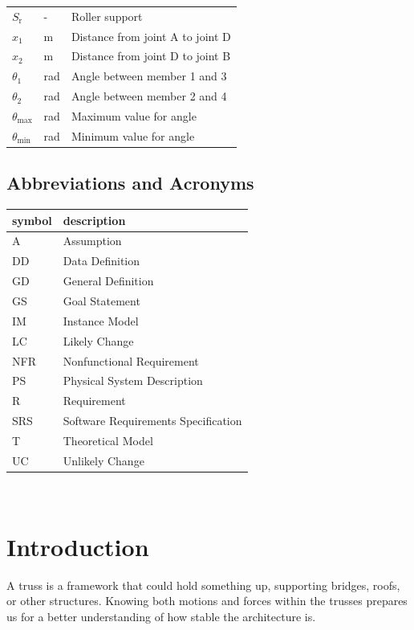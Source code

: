\documentclass[12pt]{article}
\begin{document}
\begin{longtable*}{l l p{12cm}}
$S_\text{r}$ & - & Roller support \\
$x_\text{1}$ & \si{\meter} & Distance from joint A to joint D \\
$x_\text{2}$ & \si{\meter} & Distance from joint D to joint B \\
$\theta_\text{1}$ & \si{\radian} & Angle between member 1 and 3 \\
$\theta_\text{2}$ & \si{\radian} & Angle between member 2 and 4 \\
$\theta_{\text{max}}$ & \si{\radian} & Maximum value for angle \\
$\theta_{\text{min}}$ & \si{\radian} & Minimum value for angle \\
\bottomrule
\end{longtable*}

\subsection{Abbreviations and Acronyms}

\renewcommand{\arraystretch}{1.2}
\begin{tabular}{l l} 
  \toprule		
  \textbf{symbol} & \textbf{description}\\
  \midrule 
  A & Assumption\\
  DD & Data Definition\\
  GD & General Definition\\
  GS & Goal Statement\\
  IM & Instance Model\\
  LC & Likely Change\\
  NFR & Nonfunctional Requirement\\
  PS & Physical System Description\\
  R & Requirement\\
  SRS & Software Requirements Specification\\
  T & Theoretical Model\\
  UC & Unlikely Change\\
  \bottomrule
\end{tabular}\\


\newpage


\section{Introduction}
A truss is a framework that could hold something up, supporting bridges, roofs, 
or other structures. Knowing both motions and forces within the trusses 
prepares us for a better understanding of how stable the architecture 
is. 
\end{document}
